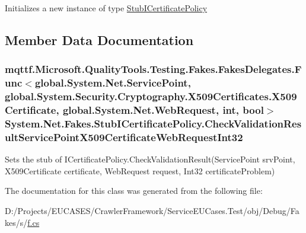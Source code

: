 Initializes a new instance of type \hyperlink{class_system_1_1_net_1_1_fakes_1_1_stub_i_certificate_policy}{Stub\-I\-Certificate\-Policy}



\subsection{Member Data Documentation}
\hypertarget{class_system_1_1_net_1_1_fakes_1_1_stub_i_certificate_policy_a4ce14737e74848a687de0f6ccd90ab94}{
\subsubsection[{Check\-Validation\-Result\-Service\-Point\-X509\-Certificate\-Web\-Request\-Int32}]{\setlength{\rightskip}{0pt plus 5cm}mqttf.\-Microsoft.\-Quality\-Tools.\-Testing.\-Fakes.\-Fakes\-Delegates.\-Func$<$global.\-System.\-Net.\-Service\-Point, global.\-System.\-Security.\-Cryptography.\-X509\-Certificates.\-X509\-Certificate, global.\-System.\-Net.\-Web\-Request, int, bool$>$ System.\-Net.\-Fakes.\-Stub\-I\-Certificate\-Policy.\-Check\-Validation\-Result\-Service\-Point\-X509\-Certificate\-Web\-Request\-Int32}}\label{class_system_1_1_net_1_1_fakes_1_1_stub_i_certificate_policy_a4ce14737e74848a687de0f6ccd90ab94}


Sets the stub of I\-Certificate\-Policy.\-Check\-Validation\-Result(\-Service\-Point srv\-Point, X509\-Certificate certificate, Web\-Request request, Int32 certificate\-Problem)



The documentation for this class was generated from the following file\-:\begin{DoxyCompactItemize}
\item 
D\-:/\-Projects/\-E\-U\-C\-A\-S\-E\-S/\-Crawler\-Framework/\-Service\-E\-U\-Cases.\-Test/obj/\-Debug/\-Fakes/s/\hyperlink{s_2f_8cs}{f.\-cs}\end{DoxyCompactItemize}
